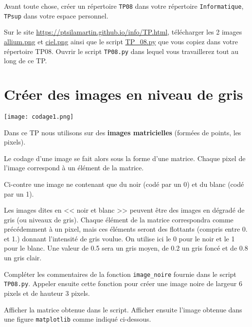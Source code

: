Avant toute chose, créer un répertoire \lstinline{TP08} dans votre répertoire \lstinline{Informatique}, \lstinline{TPsup} dans votre espace personnel.

Sur le site \url{https://ptsilamartin.github.io/info/TP.html}, télécharger les 2  images \href{https://ptsilamartin.github.io/info/TP/allium.png}{allium.png}
et \href{https://ptsilamartin.github.io/info/TP/ciel.png}{ciel.png} ainsi que le script \href{https://ptsilamartin.github.io/info/TP/TP_08.py}{TP\_08.py}  que vous copiez dans votre répertoire TP08. Ouvrir le script \lstinline{TP08.py} dans lequel vous travaillerez tout au long de ce TP.

\section*{Créer des images en niveau de gris}



\begin{marginfigure}
\texttt{[image: codage1.png]}
\end{marginfigure}
Dans ce TP nous utilisons sur des \textbf{images matricielles} (formées de points, les pixels). 

Le codage d'une image se fait alors sous la forme d'une matrice. Chaque pixel de l'image correspond à un élément de la matrice.

Ci-contre une image ne contenant que du noir (codé par un 0) et du blanc (codé par un 1).


Les images dites en << noir et blanc >> peuvent être des images en dégradé de gris (ou niveaux de gris). Chaque élément de la matrice correspondra comme précédemment à un pixel, mais ces éléments seront des flottants (compris entre 0. et 1.) donnant l'intensité de gris voulue. On utilise ici le 0 pour le noir et le 1 pour le blanc. Une valeur de 0.5 sera un gris moyen, de 0.2 un gris foncé et de 0.8 un gris clair.

\begin{question}
Compléter les commentaires de la fonction \lstinline{image_noire} fournie dans le script \lstinline{TP08.py}. Appeler ensuite cette fonction pour créer une image noire de largeur 6 pixels et de hauteur 3 pixels.
\end{question}

\begin{question}
Afficher la matrice obtenue dans le script. Afficher ensuite  l'image obtenue dans une figure \lstinline{matplotlib} comme indiqué ci-dessous.
\end{question}

